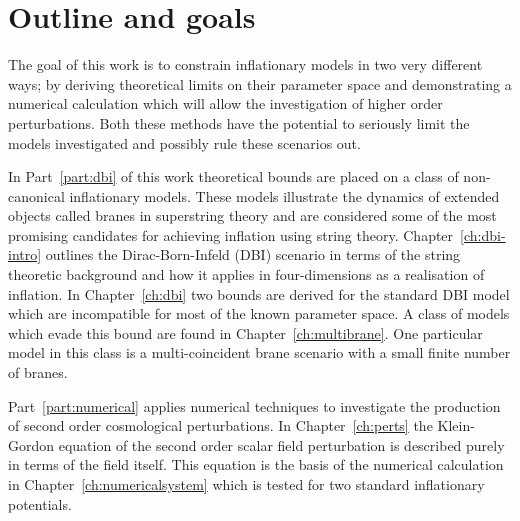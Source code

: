 \section{Outline and goals}
\label{sec:goals-intro}
The goal of this work is to constrain inflationary models in two very different
ways; by deriving theoretical limits on their parameter space and demonstrating
a numerical calculation which will allow the investigation of higher order
perturbations. Both these methods have the potential to seriously limit the
models investigated and possibly rule these scenarios out.

In Part~\ref{part:dbi} of this work theoretical bounds are placed on a class of
non-canonical inflationary models. These models illustrate the dynamics of
extended objects called branes in superstring theory and are considered some of
the most promising candidates for achieving inflation using string theory.
Chapter~\ref{ch:dbi-intro} outlines the Dirac-Born-Infeld (DBI) scenario in
terms of the string theoretic background and how it applies in four-dimensions
as a realisation of inflation. In Chapter~\ref{ch:dbi} two bounds are derived
for the standard DBI model which are incompatible for most of the known
parameter space. A class of models which evade this bound are found in
Chapter~\ref{ch:multibrane}. One particular model in this class is a
multi-coincident brane scenario with a small finite number of branes.


Part~\ref{part:numerical} applies numerical techniques to investigate the
production of second order cosmological perturbations. In
Chapter~\ref{ch:perts} the Klein-Gordon equation of the second order
scalar field perturbation is described purely in terms of the field itself.
This equation is the basis of the numerical calculation in
Chapter~\ref{ch:numericalsystem} which is tested for two standard inflationary
potentials. 


